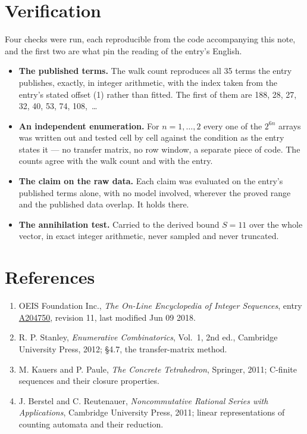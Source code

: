 \documentclass[11pt]{article}
\theoremstyle{definition}
\begin{document}
\section{Verification}

Four checks were run, each reproducible from the code accompanying this note, and the first two are what pin the reading of the entry's English.

\begin{itemize}

\item {\bfseries The published terms.} The walk count reproduces all 35 terms the entry publishes, exactly, in integer arithmetic, with the index taken from the entry's stated offset (1) rather than fitted. The first of them are 188, 28, 27, 32, 40, 53, 74, 108,~\dots

\item {\bfseries An independent enumeration.} For $n = 1,\dots,2$ every one of the $2^{6n}$ arrays was written out and tested cell by cell against the condition as the entry states it --- no transfer matrix, no row window, a separate piece of code. The counts agree with the walk count and with the entry.

\item {\bfseries The claim on the raw data.} Each claim was evaluated on the entry's published terms alone, with no model involved, wherever the proved range and the published data overlap. It holds there.

\item {\bfseries The annihilation test.} Carried to the derived bound $S = 11$ over the whole vector, in exact integer arithmetic, never sampled and never truncated.

\end{itemize}

\section{References}

\begin{enumerate}

\item OEIS Foundation Inc., \emph{The On-Line Encyclopedia of Integer Sequences}, entry \href{https://oeis.org/A204750}{A204750}, revision 11, last modified Jun 09 2018.

\item R. P. Stanley, \emph{Enumerative Combinatorics}, Vol.~1, 2nd ed., Cambridge University Press, 2012; \S4.7, the transfer-matrix method.

\item M. Kauers and P. Paule, \emph{The Concrete Tetrahedron}, Springer, 2011; C-finite sequences and their closure properties.

\item J. Berstel and C. Reutenauer, \emph{Noncommutative Rational Series with Applications}, Cambridge University Press, 2011; linear representations of counting automata and their reduction.

\end{enumerate}
\end{document}
